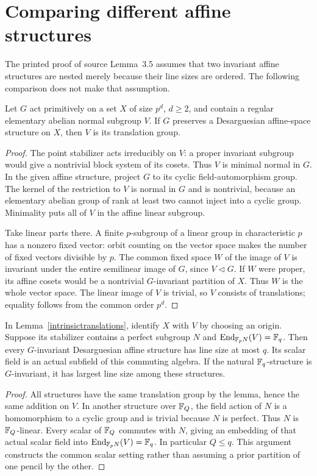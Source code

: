 \section{Comparing different affine structures}
The printed proof of source Lemma~3.5 assumes that two invariant affine
structures are nested merely because their line sizes are ordered. The
following comparison does not make that assumption.

\begin{lemma}\label{intrinsictranslations}
Let $G$ act primitively on a set $X$ of size $p^d$, $d\geq2$, and contain
a regular elementary abelian normal subgroup $V$. If $G$ preserves a
Desarguesian affine-space structure on $X$, then $V$ is its translation
group.
\end{lemma}
\begin{proof}
The point stabilizer acts irreducibly on $V$: a proper invariant subgroup
would give a nontrivial block system of its cosets. Thus $V$ is minimal
normal in $G$. In the given affine structure, project $G$ to its cyclic
field-automorphism group. The kernel of the restriction to $V$ is normal
in $G$ and is nontrivial, because an elementary abelian group of rank at
least two cannot inject into a cyclic group. Minimality puts all of $V$
in the affine linear subgroup.

Take linear parts there. A finite $p$-subgroup of a linear group in
characteristic $p$ has a nonzero fixed vector: orbit counting on the
vector space makes the number of fixed vectors divisible by $p$.
The common fixed space $W$ of the image of $V$ is invariant under the
entire semilinear image of $G$, since $V\lhd G$. If $W$ were proper,
its affine cosets would be a nontrivial $G$-invariant partition of $X$.
Thus $W$ is the whole vector space. The linear image of $V$ is trivial,
so $V$ consists of translations; equality follows from the common order
$p^d$.
\end{proof}

\begin{proposition}\label{scalarrigidity}
In Lemma~\ref{intrinsictranslations}, identify $X$ with $V$ by choosing
an origin. Suppose its stabilizer contains a perfect subgroup $N$ and
$\operatorname{End}_{\mathbb F_p N}(V)=\mathbb F_q$. Then every $G$-invariant Desarguesian affine
structure has line size at most $q$. Its scalar field is an actual
subfield of this commuting algebra. If the natural $\mathbb F_q$-structure is
$G$-invariant, it has largest line size among these structures.
\end{proposition}
\begin{proof}
All structures have the same translation group by the lemma, hence the
same addition on $V$. In another structure over $\mathbb F_Q$, the field action
of $N$ is a homomorphism to a cyclic group and is trivial because $N$ is
perfect. Thus $N$ is $\mathbb F_Q$-linear. Every scalar of $\mathbb F_Q$ commutes with
$N$, giving an embedding of that actual scalar field into
$\operatorname{End}_{\mathbb F_p N}(V)=\mathbb F_q$. In particular $Q\leq q$. This argument
constructs the common scalar setting rather than assuming a prior
partition of one pencil by the other.
\end{proof}

